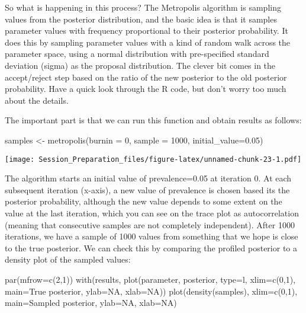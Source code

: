 \documentclass[
  12pt,
]{article}
\newenvironment{Shaded}{\begin{snugshade}}{\end{snugshade}}
\newcommand{\AttributeTok}[1]{\textcolor[rgb]{0.77,0.63,0.00}{#1}}
\newcommand{\ConstantTok}[1]{\textcolor[rgb]{0.00,0.00,0.00}{#1}}
\newcommand{\DecValTok}[1]{\textcolor[rgb]{0.00,0.00,0.81}{#1}}
\newcommand{\FloatTok}[1]{\textcolor[rgb]{0.00,0.00,0.81}{#1}}
\newcommand{\FunctionTok}[1]{\textcolor[rgb]{0.00,0.00,0.00}{#1}}
\newcommand{\NormalTok}[1]{#1}
\newcommand{\OtherTok}[1]{\textcolor[rgb]{0.56,0.35,0.01}{#1}}
\newcommand{\StringTok}[1]{\textcolor[rgb]{0.31,0.60,0.02}{#1}}
\begin{document}
So what is happening in this process? The Metropolis algorithm is
sampling values from the posterior distribution, and the basic idea is
that it samples parameter values with frequency proportional to their
posterior probability. It does this by sampling parameter values with a
kind of random walk across the parameter space, using a normal
distribution with pre-specified standard deviation (sigma) as the
proposal distribution. The clever bit comes in the accept/reject step
based on the ratio of the new posterior to the old posterior
probability. Have a quick look through the R code, but don't worry too
much about the details.

The important part is that we can run this function and obtain results
as follows:

\begin{Shaded}
\begin{Highlighting}[]
\NormalTok{samples }\OtherTok{\textless{}{-}} \FunctionTok{metropolis}\NormalTok{(}\AttributeTok{burnin =} \DecValTok{0}\NormalTok{, }\AttributeTok{sample =} \DecValTok{1000}\NormalTok{, }\AttributeTok{initial\_value=}\FloatTok{0.05}\NormalTok{)}
\end{Highlighting}
\end{Shaded}

\texttt{[image: Session\_Preparation\_files/figure-latex/unnamed-chunk-23-1.pdf]}

The algorithm starts an initial value of prevalence=0.05 at iteration 0.
At each subsequent iteration (x-axis), a new value of prevalence is
chosen based its the posterior probability, although the new value
depends to some extent on the value at the last iteration, which you can
see on the trace plot as autocorrelation (meaning that consecutive
samples are not completely independent). After 1000 iterations, we have
a sample of 1000 values from something that we hope is close to the true
posterior. We can check this by comparing the profiled posterior to a
density plot of the sampled values:

\begin{Shaded}
\begin{Highlighting}[]
\FunctionTok{par}\NormalTok{(}\AttributeTok{mfrow=}\FunctionTok{c}\NormalTok{(}\DecValTok{2}\NormalTok{,}\DecValTok{1}\NormalTok{))}
\FunctionTok{with}\NormalTok{(results, }\FunctionTok{plot}\NormalTok{(parameter, posterior, }\AttributeTok{type=}\StringTok{\textquotesingle{}l\textquotesingle{}}\NormalTok{, }
                   \AttributeTok{xlim=}\FunctionTok{c}\NormalTok{(}\DecValTok{0}\NormalTok{,}\DecValTok{1}\NormalTok{), }\AttributeTok{main=}\StringTok{\textquotesingle{}True posterior\textquotesingle{}}\NormalTok{, }\AttributeTok{ylab=}\ConstantTok{NA}\NormalTok{, }\AttributeTok{xlab=}\ConstantTok{NA}\NormalTok{))}
\FunctionTok{plot}\NormalTok{(}\FunctionTok{density}\NormalTok{(samples), }\AttributeTok{xlim=}\FunctionTok{c}\NormalTok{(}\DecValTok{0}\NormalTok{,}\DecValTok{1}\NormalTok{), }\AttributeTok{main=}\StringTok{\textquotesingle{}Sampled posterior\textquotesingle{}}\NormalTok{, }
     \AttributeTok{ylab=}\ConstantTok{NA}\NormalTok{, }\AttributeTok{xlab=}\ConstantTok{NA}\NormalTok{)}
\end{Highlighting}
\end{Shaded}
\end{document}
